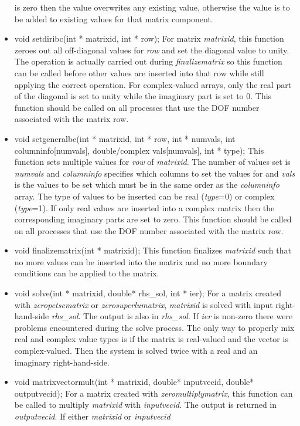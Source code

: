 \begin{itemize}
is zero then the value overwrites any existing value, otherwise the value is to be added
to existing values for that matrix component.
\item  void setdiribc(int * matrixid, int * row);  For matrix \textit{matrixid}, this function
zeroes out all off-diagonal values for \textit{row} and set the diagonal value to unity.  The operation is
actually carried out during \textit{finalizematrix} so this function can be called before other values
are inserted into that row while still applying the correct operation.  For complex-valued arrays, 
only the real part of the diagonal is set to unity while the imaginary part is set to 0.  This function 
should be called on all processes that use the DOF number associated with the matrix row.
\item  void setgeneralbc(int * matrixid, int * row, int * numvals,
		     int  columninfo[numvals], double/complex vals[numvals], int * type);
This function sets multiple values for \textit{row} of \textit{matrixid}.  The number of values set is
\textit{numvals} and \textit{columninfo} specifies which columns to set the values for and 
\textit{vals} is the values to be set which must be in the same order as the \textit{columninfo} array.
 The type of values to
 be inserted can be real (\textit{type}=0)
or complex (\textit{type}=1). If only real values are inserted into a complex matrix then the corresponding
imaginary parts are set to zero.
This function 
should be called on all processes that use the DOF number associated with the matrix row.
\item  void finalizematrix(int * matrixid);  This function finalizes \textit{matrixid} such that no
more values can be inserted into the matrix and no more boundary conditions can be applied to the matrix.
\item  void solve(int * matrixid, double* rhs\_sol, int * ier);  For a matrix created with \textit{zeropetscmatrix}
or \textit{zerosuperlumatrix}, \textit{matrixid} is solved with input right-hand-side \textit{rhs\_sol}. 
The output  is also in \textit{rhs\_sol}.  If \textit{ier} is non-zero there were problems encountered during
the solve process.  The only way to properly mix real and complex value types is if the matrix is real-valued
and the vector is complex-valued.  Then the system is solved twice with a real and an imaginary right-hand-side.  
\item  void matrixvectormult(int * matrixid, double* inputvecid, double* outputvecid);  For a matrix created with \textit{zeromultiplymatrix}, this function can be called to multiply \textit{matrixid} with \textit{inputvecid}.  The output is returned in \textit{outputvecid}.  If either \textit{matrixid} or \textit{inputvecid}

\end{itemize}
